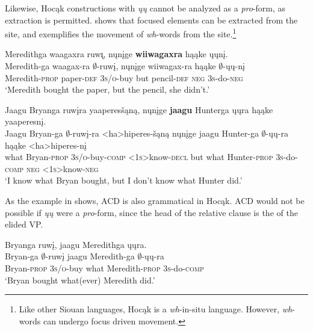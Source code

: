 \documentclass[output=paper]{LSP/langsci}
\begin{document}
Likewise, Hocąk constructions with \emph{ųų} cannot be analyzed as a \emph{pro}-form, as  extraction is permitted.  shows that focused elements can be extracted from the  site, and  exemplifies the movement of \emph{wh}-words from the  site.\footnote{Like other Siouan languages, Hocąk is a \emph{wh}-in-situ language. However, \emph{wh}-words can undergo focus driven movement.}
 
\ea
\ea\label{ex:johnson:47a} 
\glll Meredithga waagaxra ruw\k{\i}, nųnįge \textbf{wiiwagaxra} hąąke ųųnį.\\
Meredith-ga waagax-ra $\emptyset$-ruwį, nųnįge wiiwagax-ra hąąke {\db}$\emptyset$-ųų-nį\\
Meredith-\textsc{prop} paper-\textsc{def} \textsc{3s/o}-buy but pencil-\textsc{def} \textsc{neg} \textsc{3s}-do-\textsc{neg}\\
\trans `Meredith bought the paper, but the pencil, she didn't.'
 
\ex\label{ex:johnson:47b} 
\glll Jaagu Bryanga ruwįra yaaperesšąną, nųnįge \textbf{jaagu} Hunterga ųųra hąąke yaaperesnį.\\
Jaagu Bryan-ga $\emptyset$-ruwį-ra <ha>hiperes-šąną nųnįge jaagu Hunter-ga {\db}$\emptyset$-ųų-ra hąąke <ha>hiperes-nį\\
what Bryan-\textsc{prop} \textsc{3s/o}-buy-\textsc{comp} <\textsc{1s}>know-\textsc{decl} but what Hunter-\textsc{prop} \textsc{3s}-do-\textsc{comp} \textsc{neg} <\textsc{1s}>know-\textsc{neg}\\
\trans `I know what Bryan bought, but I don't know what Hunter did.'
\z
\z

 
As the example in  shows, ACD is also grammatical in Hocąk. ACD would not be possible if \emph{ųų} were a \emph{pro}-form, since the head of the relative clause is the  of the elided VP.
 
 
\ea\label{ex:johnson:48} 
\glll Bryanga ruwį, jaagu Meredithga ųųra.\\
Bryan-ga $\emptyset$-ruwį jaagu Meredith-ga {\db}$\emptyset$-ųų-ra\\
Bryan-\textsc{prop} \textsc{3s/o}-buy what Meredith-\textsc{prop} \textsc{3s}-do-\textsc{comp}\\
\trans `Bryan bought what(ever) Meredith did.'
\z
\end{document}
